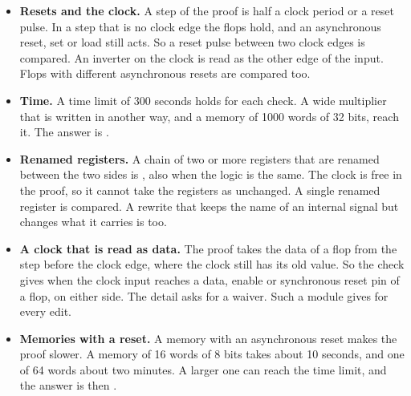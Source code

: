 \begin{itemize}
  \begin{itemize}
  \item an initial value, such as , or an  block, on
    either side, also when both sides are the same
  \item a latch
  \item a clock that reaches a flop through a multiplexer that is not tied, or through a
    divider
  \item flops on both edges of one clock
  \item an asynchronous set together with an asynchronous reset on one flop
  \item an interface port
  \item a memory that the tool cannot map to flops
  \end{itemize}
\item \textbf{Resets and the clock.} A step of the proof is half a clock period or a
  reset pulse. In a step that is no clock edge the flops hold, and an asynchronous reset,
  set or load still acts. So a reset pulse between two clock edges is compared. An inverter
  on the clock is read as the other edge of the input. Flops with different asynchronous
  resets are compared too.
\item \textbf{Time.} A time limit of 300 seconds holds for each check. A wide multiplier
  that is written in another way, and a memory of 1000 words of 32 bits, reach it. The
  answer is .
\item \textbf{Renamed registers.} A chain of two or more registers that are renamed
  between the two sides is , also when the logic is the same. The clock is
  free in the proof, so it cannot take the registers as unchanged. A single renamed register
  is compared. A rewrite that keeps the name of an internal signal but changes what it
  carries is  too.
\item \textbf{A clock that is read as data.} The proof takes the data of a flop from the
  step before the clock edge, where the clock still has its old value. So the check gives
   when the clock input reaches a data, enable or synchronous reset pin of a
  flop, on either side. The detail asks for a waiver. Such a module gives  for
  every edit.
\item \textbf{Memories with a reset.} A memory with an asynchronous reset makes the proof
  slower. A memory of 16 words of 8 bits takes about 10 seconds, and one of 64 words about
  two minutes. A larger one can reach the time limit, and the answer is then .

\end{itemize}
